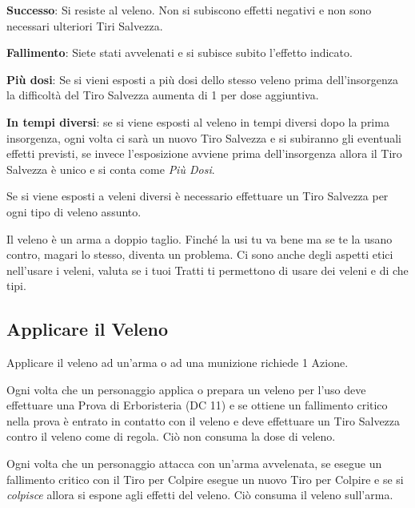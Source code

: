 \begin{multicols}{2}
\textbf{Successo}: Si resiste al veleno. Non si subiscono effetti negativi e non sono necessari ulteriori Tiri Salvezza.

\textbf{Fallimento}: Siete stati avvelenati e si subisce subito l'effetto indicato.

\textbf{Più dosi}: Se si vieni esposti a più dosi dello stesso veleno prima dell'insorgenza la difficoltà del Tiro Salvezza aumenta di 1 per dose aggiuntiva.

\textbf{In tempi diversi}: se si viene esposti al veleno in tempi diversi dopo la prima insorgenza, ogni volta ci sarà un nuovo Tiro Salvezza e si subiranno gli eventuali effetti previsti, se invece l'esposizione avviene prima dell'insorgenza allora il Tiro Salvezza è unico e si conta come \emph{Più Dosi}.

Se si viene esposti a veleni diversi è necessario effettuare un Tiro Salvezza per ogni tipo di veleno assunto.


\begin{changemargin}{0.3cm}{0.3cm}\begin{tcolorbox}[title = Veleno ?]
{Il veleno è un arma a doppio taglio. Finché la usi tu va bene ma se te la usano contro, magari lo stesso, diventa un problema. Ci sono anche degli aspetti etici nell'usare i veleni, valuta se i tuoi Tratti ti permettono di usare dei veleni e di che tipi.}\end{tcolorbox}\end{changemargin}

\subsection{Applicare il Veleno}\label{applicareveleno}

Applicare il veleno ad un'arma o ad una munizione richiede 1 Azione.

Ogni volta che un personaggio applica o prepara un veleno per l'uso deve effettuare una Prova di Erboristeria (DC 11) e se ottiene un fallimento critico nella prova è entrato in contatto con il veleno e deve effettuare un Tiro Salvezza contro il veleno come di regola. Ciò non consuma la dose di veleno.

Ogni volta che un personaggio attacca con un'arma avvelenata, se esegue un fallimento critico con il Tiro per Colpire esegue un nuovo Tiro per Colpire e se si \emph{colpisce} allora si espone agli effetti del veleno. Ciò consuma il veleno sull'arma.


\end{multicols}
